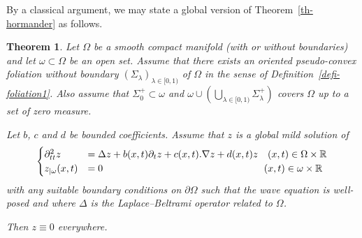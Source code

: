 \documentclass[11pt]{article}
\newtheorem{theo}{Theorem}[section]
\theoremstyle{definition}
\numberwithin{equation}{section}
\numberwithin{figure}{section}
\numberwithin{table}{section}
\newcommand{\RR}{\mathbb{R}}
\newcommand{\grad}{\nabla}
\begin{document}
By a classical argument, we may state a global version of Theorem~\ref{th-hormander} as follows.

\begin{theo}\label{th-hormander-global}
Let $\Omega$ be a smooth compact manifold (with or without boundaries) and let $\omega\subset\Omega$ be an open set. Assume that there exists an oriented pseudo-convex foliation without boundary $(\Sigma_\lambda)_{\lambda\in[0,1)}$ of $\Omega$ in the sense of Definition~\ref{defi-foliation1}. Also assume that $\Sigma_0^+\subset \omega$ and $\omega\cup \left(\bigcup_{\lambda\in[0,1)}
\Sigma_\lambda^+\right)$ covers $\Omega$ up to a set of zero measure.

Let $b$, $c$ and $d$ be bounded coefficients. Assume that $z$ is a global mild solution of
\[
\begin{cases}
\partial^2_{tt} z &=\Delta z + b(x,t)\partial_t z+c(x,t).\grad z+d(x,t)z\quad(x,t)\in\Omega\times \RR\\
z_{|\omega}(x,t)&= 0\mkern297mu(x,t)\in\omega\times\RR
\end{cases}
\]
with any suitable boundary conditions on $\partial\Omega$ such that the wave equation is well-posed and where $\Delta$ is the Laplace--Beltrami operator related to $\Omega$.

Then $z\equiv 0$ everywhere.
\end{theo}
\end{document}
